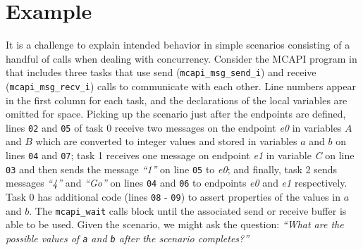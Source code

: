 \section{Example}

It is a challenge to explain intended behavior in simple scenarios
consisting of a handful of calls when dealing with concurrency. Consider
the MCAPI program in  that includes three
tasks that use send (\texttt{mcapi\_msg\_send\_i}) and receive
(\texttt{mcapi\_msg\_recv\_i}) calls to communicate with each other.
Line numbers appear in the first column for each task, and the
declarations of the local variables are omitted for space. Picking up
the scenario just after the endpoints are defined, lines \texttt{02}
and \texttt{05} of task 0 receive two messages on the endpoint
\textit{e0} in variables $A$ and $B$ which are
converted to integer values and stored in variables $a$ and
$b$ on lines \texttt{04} and \texttt{07}; task 1 receives one
message on endpoint \textit{e1} in variable \textit{C} on line
\texttt{03} and then sends the message \textit{``1''} on line \texttt{05} to
\textit{e0}; and finally, task 2 sends messages \textit{``4''} and \textit{``Go''} on
lines \texttt{04} and \texttt{06} to endpoints \textit{e0} and
\textit{e1} respectively. Task 0 has additional code (lines \texttt{08} -
\texttt{09}) to assert properties of the values in $a$ and
$b$. The \texttt{mcapi\_wait} calls block until the associated
send or receive buffer is able to be used. Given the scenario, we
might ask the question: \emph{``What are the possible values of
\texttt{a} and \texttt{b} after the scenario completes?''}


